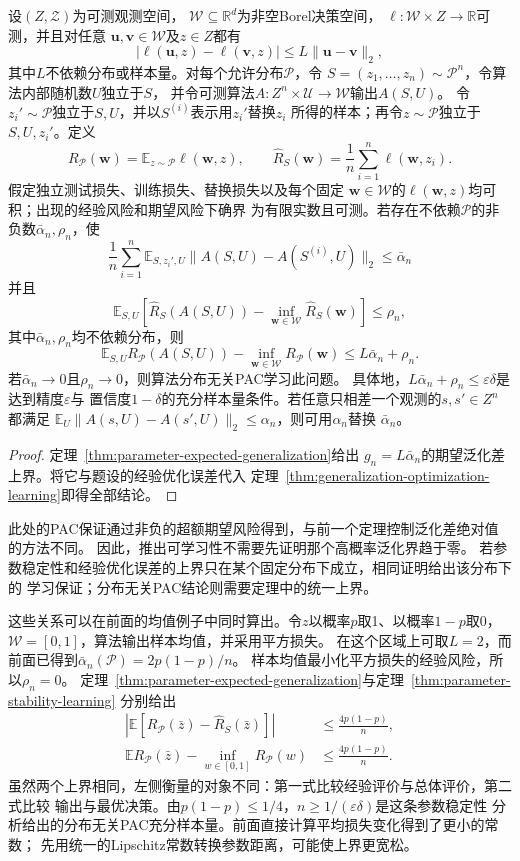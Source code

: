 \begin{theorem}[参数稳定性与可学习性]
\label{thm:parameter-stability-learning}
设$(Z,\mathcal Z)$为可测观测空间，
$\mathcal W\subseteq\mathbb R^d$为非空Borel决策空间，
$\ell:\mathcal W\times Z\to\mathbb R$可测，并且对任意
$\bm u,\bm v\in\mathcal W$及$z\in Z$都有
\[
 |\ell(\bm u,z)-\ell(\bm v,z)|
 \leq L\|\bm u-\bm v\|_2,
\]
其中$L$不依赖分布或样本量。对每个允许分布$\mathcal P$，令
$S=(z_1,\ldots,z_n)\sim\mathcal P^n$，令算法内部随机数$U$独立于$S$，
并令可测算法$A:Z^n\times\mathcal U\to\mathcal W$输出$A(S,U)$。
令$z_i'\sim\mathcal P$独立于$S,U$，并以$S^{(i)}$表示用$z_i'$替换$z_i$
所得的样本；再令$z\sim\mathcal P$独立于$S,U,z_i'$。定义
\[
 R_{\mathcal P}(\bm w)=\mathbb E_{z\sim\mathcal P}\ell(\bm w,z),
 \qquad
 \hat R_S(\bm w)=\frac1n\sum_{i=1}^n\ell(\bm w,z_i).
\]
假定独立测试损失、训练损失、替换损失以及每个固定
$\bm w\in\mathcal W$的$\ell(\bm w,z)$均可积；出现的经验风险和期望风险下确界
为有限实数且可测。若存在不依赖$\mathcal P$的非负数$\bar\alpha_n,\rho_n$，使
\[
 \frac1n\sum_{i=1}^n\mathbb E_{S,z_i',U}
 \|A(S,U)-A(S^{(i)},U)\|_2\leq\bar\alpha_n
\]
并且
\[
 \mathbb E_{S,U}\!\left[\hat R_S(A(S,U))-
 \inf_{\bm w\in\mathcal W}\hat R_S(\bm w)\right]\leq\rho_n,
\]
其中$\bar\alpha_n,\rho_n$均不依赖分布，则
\[
 \mathbb E_{S,U}R_{\mathcal P}(A(S,U))-
 \inf_{\bm w\in\mathcal W}R_{\mathcal P}(\bm w)
 \leq L\bar\alpha_n+\rho_n.
\]
若$\bar\alpha_n\to0$且$\rho_n\to0$，则算法分布无关PAC学习此问题。
具体地，$L\bar\alpha_n+\rho_n\leq\varepsilon\delta$是达到精度$\varepsilon$与
置信度$1-\delta$的充分样本量条件。若任意只相差一个观测的$s,s'\in Z^n$都满足
$\mathbb E_U\|A(s,U)-A(s',U)\|_2\leq\alpha_n$，则可用$\alpha_n$替换
$\bar\alpha_n$。
\end{theorem}
\begin{proof}
定理~\ref{thm:parameter-expected-generalization}给出
$g_n=L\bar\alpha_n$的期望泛化差上界。将它与题设的经验优化误差代入
定理~\ref{thm:generalization-optimization-learning}即得全部结论。
\end{proof}

此处的PAC保证通过非负的超额期望风险得到，与前一个定理控制泛化差绝对值的方法不同。
因此，推出可学习性不需要先证明那个高概率泛化界趋于零。
若参数稳定性和经验优化误差的上界只在某个固定分布下成立，相同证明给出该分布下的
学习保证；分布无关PAC结论则需要定理中的统一上界。

这些关系可以在前面的均值例子中同时算出。令$z$以概率$p$取1、以概率$1-p$取0，
$\mathcal W=[0,1]$，算法输出样本均值，并采用平方损失。
在这个区域上可取$L=2$，而前面已得到$\bar\alpha_n(\mathcal P)=2p(1-p)/n$。
样本均值最小化平方损失的经验风险，所以$\rho_n=0$。
定理~\ref{thm:parameter-expected-generalization}与定理~\ref{thm:parameter-stability-learning}
分别给出
\begin{align*}
 \left|\mathbb E[R_{\mathcal P}(\bar z)-\hat R_S(\bar z)]\right|
 &\leq\frac{4p(1-p)}n,\\
 \mathbb E R_{\mathcal P}(\bar z)-\inf_{w\in[0,1]}R_{\mathcal P}(w)
 &\leq\frac{4p(1-p)}n.
\end{align*}
虽然两个上界相同，左侧衡量的对象不同：第一式比较经验评价与总体评价，第二式比较
输出与最优决策。由$p(1-p)\leq1/4$，$n\geq1/(\varepsilon\delta)$是这条参数稳定性
分析给出的分布无关PAC充分样本量。前面直接计算平均损失变化得到了更小的常数；
先用统一的Lipschitz常数转换参数距离，可能使上界更宽松。

